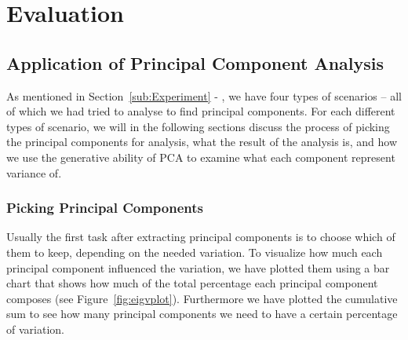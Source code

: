 \section{Evaluation}
\label{sec:Evaluation}
\subsection{Application of Principal Component Analysis}
\label{sub:ApplicationofPrincipalComponentAnalysis}
As mentioned in Section~\ref{sub:Experiment} - , we have four types of scenarios --
all of which we had tried to analyse to find principal components.
For each different types of scenario, we will in the following sections discuss the process of picking the principal components for analysis, what the result of the analysis is, and
how we use the generative ability of PCA to examine what each component represent variance of.

\subsubsection{Picking Principal Components}
\label{ssub:PickingPrincipalComponents}
Usually the first task after extracting principal components is to choose which of them to keep, depending on the needed variation. 
To visualize how much each principal component influenced the variation, we have plotted them using a bar chart that shows how much
of the total percentage each principal component composes (see Figure~\ref{fig:eigvplot}).
Furthermore we have plotted the cumulative sum to see how many principal components we need to have a certain percentage of variation.\\

  \begin{minipage}{\linewidth}
  \centering
  \label{fig:eigvplot}
  \end{minipage}\\\\

